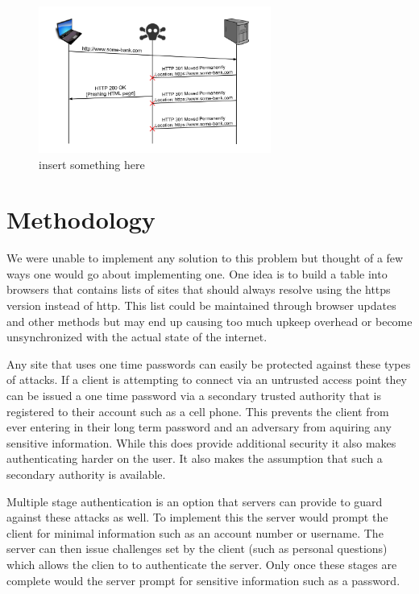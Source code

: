\documentclass{article}
\begin{document}
\begin{figure}[t]
\begin{center}

\includegraphics[width=3in]{redirect_attack.png} 
\caption{insert something here} 
\label{fg:attack}

\end{center}
\end{figure}

\section{Methodology}
We were unable to implement any solution to this problem but thought of a few ways one would go about implementing one.
One idea is to build a table into browsers that contains lists of sites that should always resolve using the https version instead of http.  This list could be maintained through browser updates and other methods but may end up causing too much upkeep overhead or become unsynchronized with the actual state of the internet.

Any site that uses one time passwords can easily be protected against these types of attacks.  If a client is attempting to connect via an untrusted access point they can be issued a one time password via a secondary trusted authority that is registered to their account such as a cell phone.  This prevents the client from ever entering in their long term password and an adversary from aquiring any sensitive information.  While this does provide additional security it also makes authenticating harder on the user.  It also makes the assumption that such a secondary authority is available.

Multiple stage authentication is an option that servers can provide to guard against these attacks as well.  To implement this the server would prompt the client for minimal information such as an account number or username.  The server can then issue challenges set by the client (such as personal questions) which allows the clien to to authenticate the server.  Only once these stages are complete would the server prompt for sensitive information such as a password.
\end{document}
